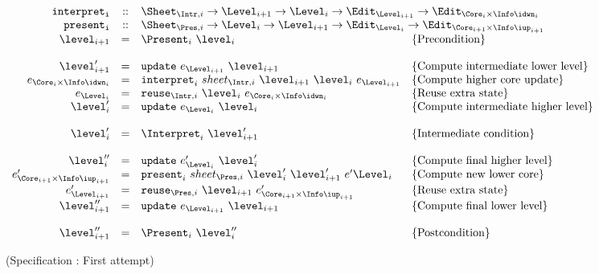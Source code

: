 \begin{small}
 \label{spec:combinationFirstAttempt}
\( \begin{array}{rcll}  
{\tt interpret_i}  & :: & \multicolumn{2}{l}{\Sheet_{\Intr,i} \rightarrow \Level_{i+1} \rightarrow \Level_{i} \rightarrow  \Edit_{\Level_{i+1}} \rightarrow \Edit_{\Core_{i}\times \Info\idwn_{i}} } \\
{\tt present_i} & :: & \multicolumn{2}{l}{ \Sheet_{\Pres,i} \rightarrow \Level_{i} \rightarrow \Level_{i+1}  \rightarrow \Edit_{\Level_{i}} \rightarrow \Edit_{\Core_{i+1}\times \Info\iup_{i+1}} } \\
\level_{i+1} 	& = & \Present_{i}~\level_{i}						& \text{\{Precondition\}}\\
\\
\level'_{i+1} 	& = & {\tt update}~e_{\Level_{i+1}}~\level_{i+1}                 & \text{\{Compute intermediate lower level\}}\\
e_{\Core_{i} \times \Info\idwn_{i}}  & = & {\tt interpret}_{i}~sheet_{\Intr,i}~\level_{i+1}~\level_{i}~e_{\Level_{i+1}} & \text{\{Compute higher core update\}}\\
e_{\Level_{i}} & = & {\tt reuse}_{\Intr,i}~\level_{i}~e_{\Core_{i}\times \Info\idwn_{i}}     & \text{\{Reuse extra state\}}\\
\level'_{i} & = & {\tt update}~e_{\Level_{i}}~\level_{i}                 & \text{\{Compute intermediate higher level\}}\\
\\\
\level'_{i} & = & \Interpret_{i}~\level'_{i+1}						& \text{\{Intermediate condition\}}\\
\\
\level''_{i} & = & {\tt update}~e'_{\Level_{i}}~\level'_{i}                 & \text{\{Compute final higher level\}}\\
e'_{\Core_{i+1}\times \Info\iup_{i+1}}  & = & {\tt present}_{i}~sheet_{\Pres,i}~\level'_{i}~\level'_{i+1}~e'{\Level_{i}} & \text{\{Compute new lower core\}}\\
e'_{\Level_{i+1}} & = & {\tt reuse}_{\Pres,i}~\level_{i+1}~e'_{\Core_{i+1}\times \Info\iup_{i+1}} & \text{\{Reuse extra state\}}\\
\level''_{i+1} & = & {\tt update}~e_{\Level_{i+1}}~\level_{i+1}                 & \text{\{Compute final lower level\}}\\
\\
\level''_{i+1} & = & \Present_{i}~\level''_{i}						& \text{\{Postcondition\}}\\
\end{array}\)
\end{small}
\begin{center}(Specification \thespecification: First attempt)\end{center}\vspace{1em}

